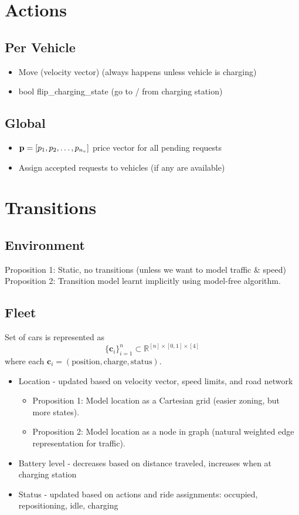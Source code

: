 \documentclass[12pt]{article}
\begin{document}
\newpage
\section*{Actions}
\subsection*{Per Vehicle}
\begin{itemize}
		\item Move (velocity vector) (always happens unless vehicle is charging)
		\item bool flip\_charging\_state (go to / from charging station)
\end{itemize}

\subsection*{Global}
\begin{itemize}
		\item $\mathbf{p} = [p_1, p_2, \ldots, p_{n_v}]$ price vector for all pending requests
		\item Assign accepted requests to vehicles (if any are available)
\end{itemize}

\section*{Transitions}
\subsection*{Environment}
Proposition 1: Static, no transitions (unless we want to model traffic \& speed) \\
Proposition 2: Transition model learnt implicitly using model-free algorithm.
\subsection*{Fleet}
Set of cars is represented as \[\{ \mathbf{c}_i \}_{i=1}^{n} \subset \mathbb{R}^{[n] \times [0,1] \times [4]} \] where each $\mathbf{c}_i = (\text{position}, \text{charge}, \text{status})$.\\
\begin{itemize}
		\item Location - updated based on velocity vector, speed limits, and road network
        \begin{itemize}
            \item Proposition 1: Model location as a Cartesian grid (easier zoning, but more states).
            \item Proposition 2: Model location as a node in graph (natural weighted edge representation for traffic).
        \end{itemize}
		\item Battery level - decreases based on distance traveled, increases when at charging station
		\item Status - updated based on actions and ride assignments: occupied, repositioning, idle, charging
\end{itemize}
\end{document}
